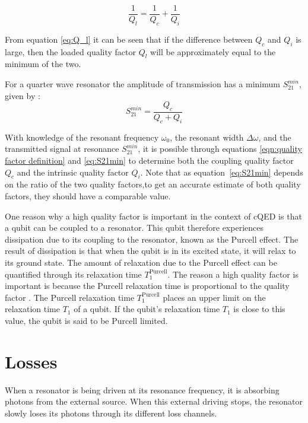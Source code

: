     \begin{equation}
        \frac{1}{Q_l} = \frac{1}{Q_c} + \frac{1}{Q_i}
        \label{eq:Q_l}
    \end{equation}

    From equation \ref{eq:Q_l} it can be seen that if the difference between $Q_c$ and $Q_i$ is large, then the loaded quality factor $Q_l$ will be approximately equal to the minimum of the two.


    For a quarter wave resonator the amplitude of transmission has a minimum $S_{21}^{min}$, given by \cite[p29]{Mazin}:
    \begin{equation}
        S_{21}^{min} = \frac{Q_c}{Q_c + Q_i}
        \label{eq:S21min}
    \end{equation}

    With knowledge of the resonant frequency $\omega_0$, the resonant width $\Delta \omega$, and the transmitted signal at resonance $S_{21}^{min}$, it is possible through equations \ref{eqn:quality factor definition} and \ref{eq:S21min} to determine both the coupling quality factor $Q_c$ and the intrinsic quality factor $Q_i$. Note that as equation~\ref{eq:S21min} depends on the ratio of the two quality factors,to get an accurate estimate of both quality factors, they should have a comparable value.

    One reason why a high quality factor is important in the context of cQED is that a qubit can be coupled to a resonator. This qubit therefore experiences dissipation due to its coupling to the resonator, known as the Purcell effect. The result of dissipation is that when the qubit is in its excited state, it will relax to its ground state. The amount of relaxation due to the Purcell effect can be quantified through its relaxation time $T_1^\text{Purcell}$. The reason a high quality factor is important is because the Purcell relaxation time is proportional to the quality factor \cite[p~22]{Geerlings}. The Purcell relaxation time $T_1^\text{Purcell}$ places an upper limit on the relaxation time $T_1$ of a qubit. If the qubit's relaxation time $T_1$ is close to this value, the qubit is said to be Purcell limited.



  \section{Losses}
    \label{sec:Losses}

      When a resonator is being driven at its resonance frequency, it is absorbing photons from the external source. When this external driving stops, the resonator slowly loses its photons through its different loss channels.

